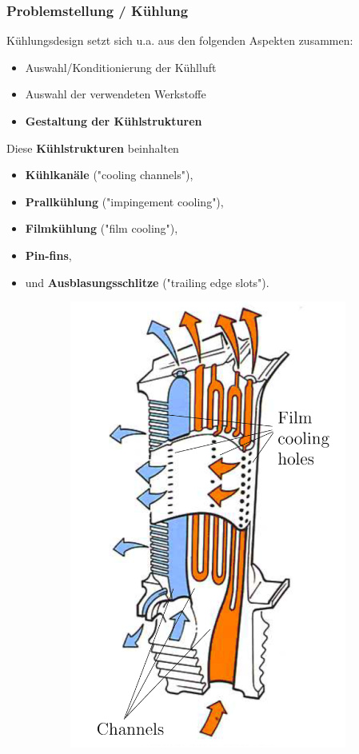 \documentclass[8pt, aspectratio=169]{beamer}
\begin{document}
\begin{frame}
	\frametitle{Problemstellung / Kühlung}
	\vspace{-1cm}\hspace{-0.5cm}
	\begin{minipage}[t]{0.5\textwidth}
		Kühlungsdesign setzt sich u.a. aus den folgenden Aspekten zusammen:
		\begin{itemize}
			\item Auswahl/Konditionierung der Kühlluft
			\item Auswahl der verwendeten Werkstoffe
			\item \textbf{Gestaltung der Kühlstrukturen}
		\end{itemize}
		\vspace{1em}
		Diese \textbf{Kühlstrukturen} beinhalten
		\begin{itemize}
			\item \textbf{Kühlkanäle} ("cooling channels"),
			\item \textbf{Prallkühlung} ("{}impingement cooling"),
			\item \textbf{Filmkühlung} ("film cooling"),
			\item \textbf{Pin-fins},
			\item und \textbf{Ausblasungsschlitze} ("trailing edge slots").
		\end{itemize}
	\end{minipage}
	\begin{minipage}[t]{0.48\textwidth}
			\begin{figure}[H]
			\centering
			\begin{subfigure}{.49\textwidth}
				\centering
				\includegraphics[width=.8\textwidth]{../../assets/rollsroyce/11.png}

\end{subfigure}
\end{figure}
\end{minipage}
\end{frame}
\end{document}
